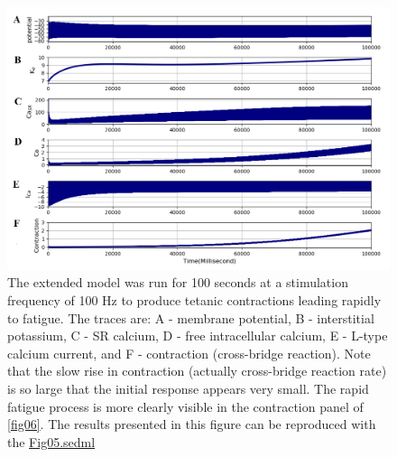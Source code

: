 \documentclass[fleqn,10pt]{physiome}
\begin{document}
\begin{figure}[h!]
\centering
\includegraphics[width=0.9\linewidth]{figure05}
\caption{The extended model was run for 100 seconds at a stimulation frequency of 100 Hz to produce tetanic contractions leading rapidly to fatigue. The traces are: A - membrane potential, B - interstitial potassium, C - SR calcium, D - free intracellular calcium, E - L-type calcium current, and F - contraction (cross-bridge reaction). Note that the slow rise in contraction (actually cross-bridge reaction rate) is so large that the initial response appears very small. The rapid fatigue process is more clearly visible in the contraction panel of \autoref{fig06}. The results presented in this figure can be reproduced with the \href{https://models.physiomeproject.org/workspace/5f4/file/26289d9227fbf4f66ca8106d8bf80ff9a51a5ac6/Fig05.sedml}{Fig05.sedml}}
\label{fig05}
\end{figure}
\end{document}
